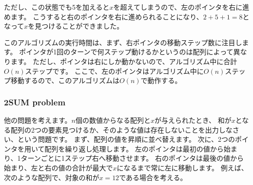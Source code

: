 ただし、この状態でも5を加えると$x$を超えてしまうので、左のポインタを右に進めます。
こうすると右のポインタを右に進められることになり、$2+5+1=8$となって$x$を見つけることができました。

\begin{center}
\end{center}

このアルゴリズムの実行時間は、まず、右ポインタの移動ステップ数に注目します。
ポインタが1回のターンで何ステップ動けるかというのは配列によって異なります。
ただし、ポインタは右にしか動かないので、アルゴリズム中に合計$O(n)$ステップです。
ここで、左のポインタはアルゴリズム中に$O(n)$ステップ移動するので、このアルゴリズムは$O(n)$で動作する。

\subsubsection{2SUM problem}


他の問題を考えます。$n$個の数値からなる配列と$x$が与えられたとき、
和が$x$となる配列の2つの要素見つけるか、そのような値は存在しないことを出力しなさい、という問題です。
まず、配列の値を昇順に並べ替えます。
次に、2つのポインタを用いて配列を繰り返し処理します。
左のポインタは最初の値から始まり、1ターンごとに1ステップ右へ移動させます。
右のポインタは最後の値から始まり、左と右の値の合計が最大で$x$になるまで常に左に移動します。
例えば、次のような配列で、対象の和が$x=12$である場合を考える。

\begin{center}
\end{center}


